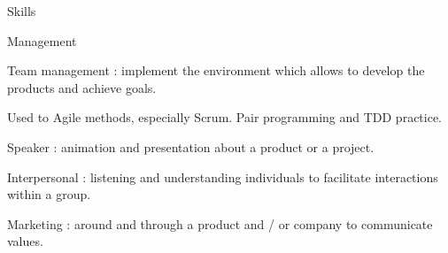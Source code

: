\begin{rSection}{Skills}
  \begin{rSubsection}{Management}{}{}{}
    \item Team management : implement the environment which allows to develop the products and achieve goals.
    \item Used to Agile methods, especially Scrum. Pair programming and TDD practice.
    \item Speaker : animation and presentation about a product or a project.
    \item Interpersonal : listening and understanding individuals to facilitate interactions within a group.
    \item Marketing : around and through a product and / or company to communicate values.
  \end{rSubsection}

\end{rSection}
